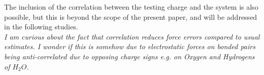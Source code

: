 \documentclass[a4paper]{article}
\begin{document}

The inclusion of the correlation between the testing
charge and the system is also possible, but this is beyond the scope
of the present paper, and will be addressed in the following studies.\\





\textit{
I am curious about the fact that correlation reduces force errors
compared to usual estimates. I wonder if this is somehow due to
electrostatic forces on bonded pairs being anti-correlated due to
opposing charge signs e.g. on Oxygen and Hydrogens of $H_2O$.
}
\end{document}
